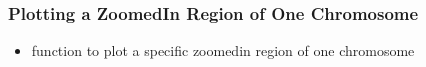 \documentclass[letterpaper,10pt,english]{sphinxhowto}
\begin{document}
\begin{sphinxVerbatim}[commandchars=\\\{\}]
 \PYG{p}{[} \PYG{p}{]} 
           
\end{sphinxVerbatim}


\subsubsection{Plotting a Zoomed\sphinxhyphen{}In Region of One Chromosome}
\label{\detokenize{index:plotting-a-zoomed-in-region-of-one-chromosome}}\begin{itemize}
\item {} 
\sphinxAtStartPar
function to plot a specific zoomed\sphinxhyphen{}in region of one chromosome

\end{itemize}
\end{document}

